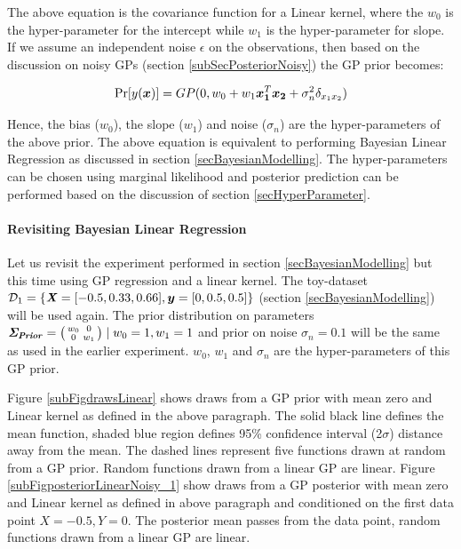 The above equation is the covariance function for a Linear kernel, where the $w_{0}$ is the hyper-parameter for the intercept while $w_{1}$ is the hyper-parameter for slope. If we assume an independent noise $\epsilon$ on the observations, then based on the discussion on noisy GPs (section \ref{subSecPosteriorNoisy}) the GP prior becomes:

\begin{equation}\label{eqNoisyPriorDistributionOverLinearFunctions}
    \Pr[y(\boldsymbol{x})] = GP(0, w_{0} + w_{1} \boldsymbol{x_{1}}^T \boldsymbol{x_{2}} + \sigma_{n}^2\delta_{x_{1} x_{2}})
\end{equation}

Hence, the bias ($w_{0}$), the slope ($w_{1}$) and noise ($\sigma_{n}$) are the hyper-parameters of the above prior. The above equation is equivalent to performing Bayesian Linear Regression as discussed in section \ref{secBayesianModelling}. The hyper-parameters can be chosen using marginal likelihood and posterior prediction can be performed based on the discussion of section \ref{secHyperParameter}. 

\begin{mdframed}[hidealllines=true,backgroundcolor=lightgray!20]
\paragraph{Revisiting Bayesian Linear Regression}\label{paraLinearGPExperiment}
Let us revisit the experiment performed in section \ref{secBayesianModelling} but this time using GP regression and a linear kernel. The toy-dataset $\mathcal{D}_{1} = \{\bm{\mathit{X}} = [-0.5, 0.33, 0.66], \boldsymbol{y} = [0, 0.5, 0.5]\}$ (section \ref{secBayesianModelling}) will be used again. The prior distribution on parameters $\bm{\mathit{\Sigma_{Prior}}} =  \bigl( \begin{smallmatrix} w_{0} & 0\\ 0 & w_{1}\end{smallmatrix}\bigr)  \mid w_{0} = 1, w_{1} = 1$ and prior on noise $\sigma_{n} = 0.1$ will be the same as used in the earlier experiment. $w_{0}$, $w_{1}$ and $\sigma_{n}$ are the hyper-parameters of this GP prior. 

Figure \ref{subFigdrawsLinear} shows draws from a GP prior with mean zero and Linear kernel as defined in the above paragraph. The solid black line defines the mean function, shaded blue region defines 95\% confidence interval (2$\sigma$) distance away from the mean. The dashed lines represent five functions drawn at random from a GP prior. Random functions drawn from a linear GP are linear. Figure \ref{subFigposteriorLinearNoisy_1} show draws from a GP posterior with mean zero and Linear kernel  as defined in above paragraph and conditioned on the first data point $X = -0.5, Y = 0$. The posterior mean passes from the data point, random functions drawn from a linear GP are linear.
\end{mdframed}

